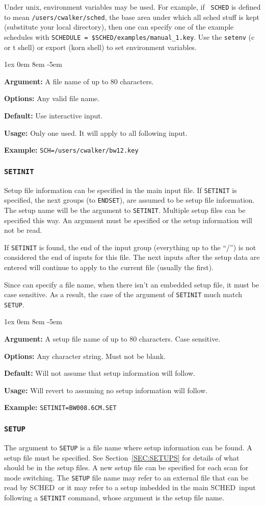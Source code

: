 \documentclass{report}
\newcommand{\schedb}{{\sc SCHED~}}
\newcommand{\rcwbox}[5]{
  \begin{list}{}{\parsep 1ex  \itemsep 0em
                 \leftmargin 8em  \itemindent -5em }
    \item {\bf Argument:} #1
    \item {\bf Options:}  #2
    \item {\bf Default:}  #3
    \item {\bf Usage:}    #4
    \item {\bf Example:}  #5
  \end{list}
}
\begin{document}
Under unix, environment variables may be used.  For example, if {\tt
SCHED} is defined to mean {\tt /users/cwalker/sched}, the base
area under which all sched stuff is kept (substitute your local
directory), then one can specify one of the example schedules with
{\tt SCHEDULE = \$SCHED/examples/manual\_1.key}.  Use the {\tt setenv}
(c or t shell) or export (korn shell) to set environment variables.

\rcwbox
{A file name of up to 80 characters.}
{Any valid file name.}
{Use interactive input.}
{Only one used. It will apply to all following input.}
{{\tt SCH=/users/cwalker/bw12.key}}


\subsubsection{\label{MP:SETINIT}{\tt SETINIT}}

Setup file information can be specified in the main input file.  If
{\tt SETINIT} is specified, the next groups (to {\tt ENDSET}), are
assumed to be setup file information.  The setup name will be the
argument to {\tt SETINIT}.  Multiple setup files can be specified
this way.  An argument must be specified or the setup information
will not be read.

If {\tt SETINIT} is found, the end of the input group (everything up
to the ``/'') is not considered the end of inputs for this file.  The
next inputs after the setup data are entered will continue to apply to
the current file (usually the first).

Since  can specify a file name, when
there isn't an embedded setup file, it must be case sensitive.  As
a result, the case of the argument of {\tt SETINIT} much match
{\tt SETUP}.

\rcwbox
{A setup file name of up to 80 characters. Case sensitive.}
{Any character string.  Must not be blank.}
{Will not assume that setup information will follow.}
{Will revert to assuming no setup information will follow.}
{{\tt SETINIT=BW008.6CM.SET}}

\subsubsection{\label{MP:SETUP}{\tt SETUP}}

The argument to {\tt SETUP} is a file name where setup information can
be found.  A setup file must be specified.
See Section~\ref{SEC:SETUPS} for details of what should be in
the setup files. A new setup file can be specified for each scan for
mode switching.  The {\tt SETUP} file name may refer to an external
file that can be read by \schedb or it may refer to a setup
imbedded in the main \schedb input following a {\tt SETINIT}
command, whose argument is the setup file name.
\end{document}
